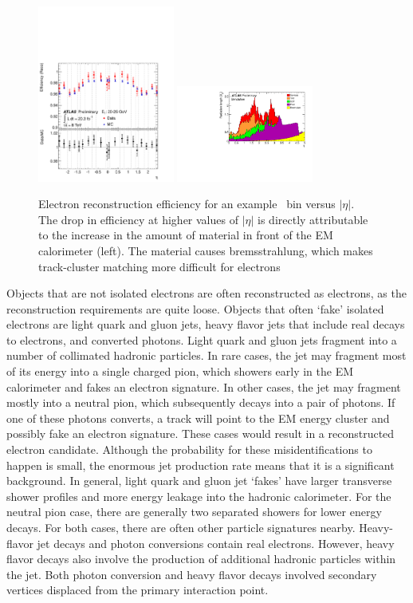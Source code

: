 \begin{figure}[!t]
\centering 
\includegraphics[width=0.40\textwidth]{figs/electron/fig_26b}
\includegraphics[width=0.40\textwidth]{figs/electron/fig_01b}
\caption{Electron reconstruction efficiency for an example \pt\ bin versus $|\eta|$. The drop in efficiency at higher values of $|\eta|$ is directly attributable to the increase in the amount of material in front of the EM calorimeter (left). The material causes bremsstrahlung, which makes track-cluster matching more difficult for electrons}
\label{figure:electron_reco}
\end{figure}



Objects that are not isolated electrons are often reconstructed as electrons, as the reconstruction requirements are quite loose. Objects that often `fake' isolated electrons are light quark and gluon jets, heavy flavor jets that include real decays to electrons, and converted photons. Light quark and gluon jets fragment into a number of collimated hadronic particles. In rare cases, the jet may fragment most of its energy into a single charged pion, which showers early in the EM calorimeter and fakes an electron signature. In other cases, the jet may fragment mostly into a neutral pion, which subsequently decays into a pair of photons. If one of these photons converts, a track will point to the EM energy cluster and possibly fake an electron signature. These cases would result in a reconstructed electron candidate. Although the probability for these misidentifications to happen is small, the enormous jet production rate means that it is a significant background. In general, light quark and gluon jet `fakes' have larger transverse shower profiles and more energy leakage into the hadronic calorimeter. For the neutral pion case, there are generally two separated showers for lower energy decays. For both cases, there are often other particle signatures nearby.  
Heavy-flavor jet decays and photon conversions contain real electrons. However, heavy flavor decays also involve the production of additional hadronic particles within the jet. Both photon conversion and heavy flavor decays involved secondary vertices displaced from the primary interaction point. 


